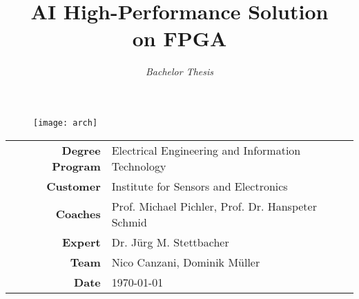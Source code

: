\documentclass[final]{aionfpgareport}
\title{\textbf{{\Huge AI High-Performance Solution \\[2mm] on FPGA}}}
\author{\textit{{\LARGE Bachelor Thesis}}}
\date{}
\begin{document}
\maketitle

\vfill
\begin{figure}[h]
  \centering
  \texttt{[image: arch]}
\end{figure}

\vfill
\begin{center}
  \begin{tabular}{>{\bfseries\large}rl}
    Degree Program & Electrical Engineering and Information Technology \\[2mm]
    Customer       & Institute for Sensors and Electronics \\[2mm]
    Coaches        & Prof. Michael Pichler, Prof. Dr. Hanspeter Schmid \\[2mm]
    Expert         & Dr. J\"urg M. Stettbacher \\[2mm]
    Team           & Nico Canzani, Dominik M\"uller \\[2mm]
    Date           & \today
  \end{tabular}
\end{center}
\clearpage

\cleardoublepage
{}

\clearpage


\clearpage

\tableofcontents
\clearpage

\cleardoublepage
{}










\printbibliography[heading=bibintoc]
\label{sec:literature}
\clearpage

\printglossary[type=\acronymtype]
\clearpage




\end{document}
